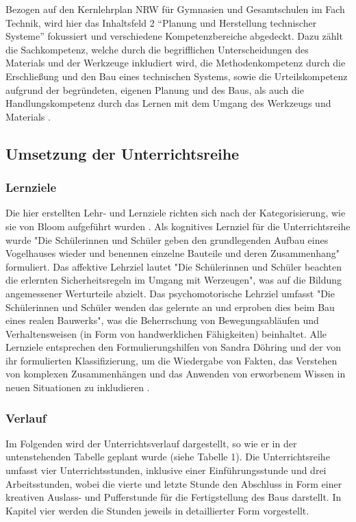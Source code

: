 \documentclass[12pt]{article}
\begin{document}
Bezogen auf den Kernlehrplan NRW für Gymnasien und Gesamtschulen im Fach Technik, wird hier das Inhaltsfeld 2 \enquote{Planung und Herstellung technischer Systeme} \Autocite[][S. 13]{ministerium_fur_schule_und_bildung_kernlehrplan_2020} fokussiert und verschiedene Kompetenzbereiche abgedeckt. Dazu zählt die Sachkompetenz, welche durch die begrifflichen Unterscheidungen des Materials und der Werkzeuge inkludiert wird, die Methodenkompetenz durch die Erschließung und den Bau eines technischen Systems, sowie die Urteilskompetenz aufgrund der begründeten, eigenen Planung und des Baus, als auch die Handlungskompetenz durch das Lernen mit dem Umgang des Werkzeugs und Materials \Autocite[vgl.][S. 12]{ministerium_fur_schule_und_bildung_kernlehrplan_2020}. 

\subsection{Umsetzung der Unterrichtsreihe}
\subsubsection{Lernziele}
Die hier erstellten Lehr- und Lernziele richten sich nach der Kategorisierung, wie sie von Bloom aufgeführt wurden \autocite[vgl.][]{sachsisches_e-competence_zertifikat_formulierung_2010}. Als kognitives Lernziel für die Unterrichtsreihe wurde "Die Schülerinnen und Schüler geben den grundlegenden Aufbau eines Vogelhauses wieder und benennen einzelne Bauteile und deren Zusammenhang" formuliert. Das affektive Lehrziel lautet "Die Schülerinnen und Schüler beachten die erlernten Sicherheitsregeln im Umgang mit Werzeugen", was auf die Bildung angemessener Werturteile abzielt. Das psychomotorische Lehrziel umfasst "Die Schülerinnen und Schüler wenden das gelernte an und erproben dies beim Bau eines realen Bauwerks", was die Beherrschung von Bewegungsabläufen und Verhaltensweisen (in Form von handwerklichen Fähigkeiten) beinhaltet. Alle Lernziele entsprechen den Formulierungshilfen von Sandra Döhring und der von ihr formulierten Klassifizierung, um die Wiedergabe von Fakten, das Verstehen von komplexen Zusammenhängen und das Anwenden von erworbenem Wissen in neuen Situationen zu inkludieren \autocite[vgl.][]{sachsisches_e-competence_zertifikat_formulierung_2010}.

\subsubsection{Verlauf}
Im Folgenden wird der Unterrichtsverlauf dargestellt, so wie er in der untenstehenden Tabelle geplant wurde (siehe Tabelle 1). Die Unterrichtsreihe umfasst vier Unterrichtsstunden, inklusive einer Einführungsstunde und drei Arbeitsstunden, wobei die vierte und letzte Stunde den Abschluss in Form einer kreativen Auslass- und Pufferstunde für die Fertigstellung des Baus darstellt. In Kapitel vier werden die Stunden jeweils in detaillierter Form vorgestellt.
\end{document}
